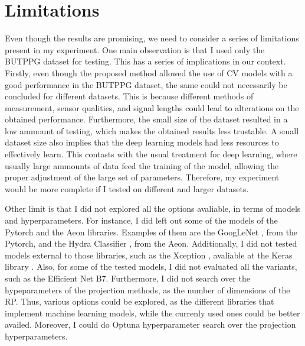 




\section{Limitations}

Even though the results are promising, we need to consider a series of limitations present in my experiment. One main observation is that I used only the BUTPPG dataset for testing. This has a series of implications in our context. Firstly, even though the proposed method allowed the use of \gls{CV} models with a good performance in the BUTPPG dataset, the same could not necessarily be concluded for different datasets. This is because different methods of measurement, sensor qualities, and signal lengths could lead to alterations on the obtained performance. Furthermore, the small size of the dataset resulted in a low ammount of testing, which makes the obtained results less trustable. A small dataset size also implies that the deep learning models had less resources to effectively learn. This contasts with the usual treatment for deep learning, where usually large ammounts of data feed the training of the model, allowing the proper adjustment of the large set of parameters. Therefore, my experiment would be more complete if I tested on different and larger datasets.

Other limit is that I did not explored all the options avaliable, in terms of models and hyperparameters. For instance, I did left out some of the models of the Pytorch and the Aeon libraries. Examples of them are the GoogLeNet \cite{GoogLeNet}, from the Pytorch, and the Hydra Classifier \cite{HydraClassifier}, from the Aeon. Additionally, I did not tested models external to those libraries, such as the Xception \cite{Xception}, avaliable at the Keras library \cite{Keras}. Also, for some of the tested models, I did not evaluated all the variants, such as the Efficient Net B7. Furthermore, I did not search over the hypeparameters of the projection methods, as the number of dimensions of the \gls{RP}. Thus, various options could be explored, as the different libraries that implement machine learning models, while the currenly used ones could be better availed. Moreover, I could do Optuna hyperparameter search over the projection hyperparameters.

